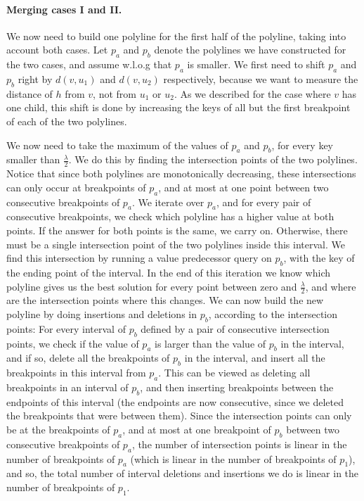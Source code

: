 \documentclass[11pt,a4paper]{article}
\theoremstyle{definition}
\theoremstyle{remark}
\begin{document}
\paragraph{Merging cases I and II.}
We now need to build one polyline for the first half of the polyline, taking into account both cases. Let $p_a$ and $p_b$ denote the polylines we have constructed for the two cases, and assume w.l.o.g that $p_a$ is smaller. We first need to shift $p_a$ and $p_b$ right by $d(v,u_1)$ and $d(v,u_2)$ respectively, because we want to measure the distance of $h$ from $v$, not from $u_1$ or $u_2$. As we described for the case where $v$ has one child, this shift is done by increasing the keys of all but the first breakpoint of each of the two polylines.

We now need to take the maximum of the values of $p_a$ and $p_b$, for every key smaller than $\frac{\lambda}{2}$. We do this by finding the intersection points of the two polylines. Notice that since both polylines are monotonically decreasing, these intersections can only occur at breakpoints of $p_a$, and at most at one point between two consecutive breakpoints of $p_a$. We iterate over $p_a$, and for every pair of consecutive breakpoints, we check which polyline has a higher value at both points. If the answer for both points is the same, we carry on. Otherwise, there must be a single intersection point of the two polylines inside this interval. We find this intersection by running a value predecessor query on $p_b$, with the key of the ending point of the interval. In the end of this iteration we know which polyline gives us the best solution for every point between zero and $\frac{\lambda}{2}$, and where are the intersection points where this changes. We can now build the new polyline by doing insertions and deletions in $p_b$, according to the intersection points: For every interval of $p_b$ defined by a pair of consecutive intersection points, we check if the value of $p_a$ is larger than the value of $p_b$ in the interval, and if so, delete all the breakpoints of $p_b$ in the interval, and insert all the breakpoints in this interval from $p_a$. This can be viewed as deleting all breakpoints in an interval of $p_b$, and then inserting breakpoints between the endpoints of this interval (the endpoints are now consecutive, since we deleted the breakpoints that were between them). Since the intersection points can only be at the breakpoints of $p_a$, and at most at one breakpoint of $p_b$ between two consecutive breakpoints of $p_a$, the number of intersection points is linear in the number of breakpoints of $p_a$ (which is linear in the number of breakpoints of $p_1$), and so, the total number of interval deletions and insertions we do is linear in the number of breakpoints of $p_1$.
\end{document}
